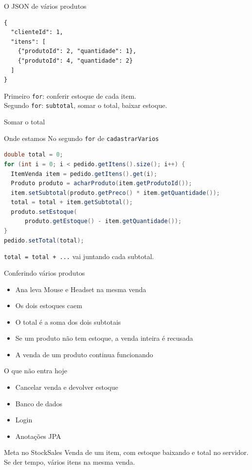 \documentclass[aspectratio=169,11pt]{beamer}
\newcommand{\onde}[1]{%
  \begin{block}{Onde estamos}
    #1
  \end{block}
}
\begin{document}
\begin{frame}[fragile]{O JSON de vários produtos}
\begin{lstlisting}[basicstyle=\ttfamily\footnotesize]
{
  "clienteId": 1,
  "itens": [
    {"produtoId": 2, "quantidade": 1},
    {"produtoId": 4, "quantidade": 2}
  ]
}
\end{lstlisting}

  \vspace{0.4em}
  Primeiro \texttt{for}: conferir estoque de cada item.\\
  Segundo \texttt{for}: \texttt{subtotal}, somar o total, baixar estoque.
\end{frame}

\begin{frame}[fragile]{Somar o total}
  \onde{No segundo \texttt{for} de \texttt{cadastrarVarios}}

\begin{lstlisting}[language=Java,basicstyle=\ttfamily\scriptsize]
double total = 0;
for (int i = 0; i < pedido.getItens().size(); i++) {
  ItemVenda item = pedido.getItens().get(i);
  Produto produto = acharProduto(item.getProdutoId());
  item.setSubtotal(produto.getPreco() * item.getQuantidade());
  total = total + item.getSubtotal();
  produto.setEstoque(
      produto.getEstoque() - item.getQuantidade());
}
pedido.setTotal(total);
\end{lstlisting}

  \texttt{total = total + ...} vai juntando cada subtotal.
\end{frame}

\begin{frame}{Conferindo vários produtos}
  \begin{itemize}
    \item [ ] Ana leva Mouse e Headset na mesma venda
    \item [ ] Os dois estoques caem
    \item [ ] O total é a soma dos dois subtotais
    \item [ ] Se um produto não tem estoque, a venda inteira
          é recusada
    \item [ ] A venda de um produto continua funcionando
  \end{itemize}
\end{frame}

\begin{frame}{O que não entra hoje}
  \begin{itemize}
    \item Cancelar venda e devolver estoque
    \item Banco de dados
    \item Login
    \item Anotações JPA
  \end{itemize}

  \vspace{0.5em}
  \begin{block}{Meta no StockSales}
    Venda de um item, com estoque baixando e total no servidor.\\
    Se der tempo, vários itens na mesma venda.
  \end{block}
\end{frame}
\end{document}
